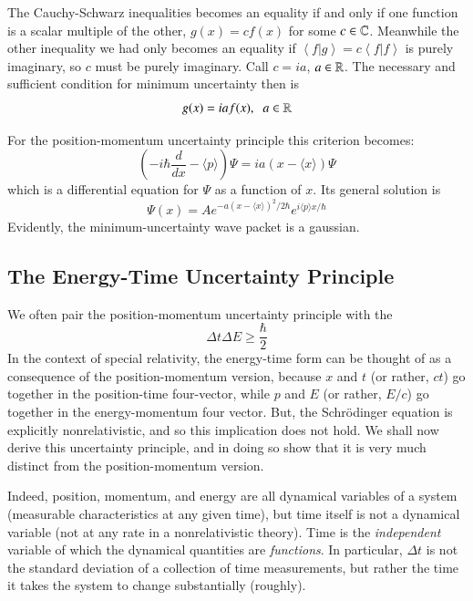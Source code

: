 \documentclass[12pt, a4paper, oneside, openright, titlepage]{book}
\newcommand{\braket}[2]{\left\langle#1\right\vert\left.#2\right\rangle}
\begin{document}
The Cauchy-Schwarz inequalities becomes an equality if and only if one function is a scalar multiple of the other, $g(x) = cf(x)$ for some $c \in \mathbb C$. Meanwhile the other inequality we had only becomes an equality if $\braket{f}{g} = c\braket{f}{f}$ is purely imaginary, so $c$ must be purely imaginary. Call $c = ia$, $a \in \mathbb R$. The necessary and sufficient condition for minimum uncertainty then is $$g(x) = iaf(x),\;\;a \in \mathbb R$$


For the position-momentum uncertainty principle this criterion becomes: $$\left(-i\hbar \frac{d}{dx} - \langle p \rangle\right)\Psi = ia(x - \langle x \rangle)\Psi$$
which is a differential equation for $\Psi$ as a function of $x$. Its general solution is $$\Psi(x) = Ae^{-a(x-\langle x\rangle)^2/2\hbar}e^{i\langle p\rangle x/\hbar}$$
Evidently, the minimum-uncertainty wave packet is a gaussian.

\subsection{The Energy-Time Uncertainty Principle}

We often pair the position-momentum uncertainty principle with the  $$\Delta t\Delta E \geq \frac{\hbar}{2}$$ 
In the context of special relativity, the energy-time form can be thought of as a consequence of the position-momentum version, because $x$ and $t$ (or rather, $ct$) go together in the position-time four-vector, while $p$ and $E$ (or rather, $E/c$) go together in the energy-momentum four vector. But, the Schr\"{o}dinger equation is explicitly nonrelativistic, and so this implication does not hold. We shall now derive this uncertainty principle, and in doing so show that it is very much distinct from the position-momentum version.

Indeed, position, momentum, and energy are all dynamical variables of a system (measurable characteristics at any given time), but time itself is not a dynamical variable (not at any rate in a nonrelativistic theory). Time is the \emph{independent} variable of which the dynamical quantities are \emph{functions}. In particular, $\Delta t$ is not the standard deviation of a collection of time measurements, but rather the time it takes the system to change substantially (roughly).
\end{document}
